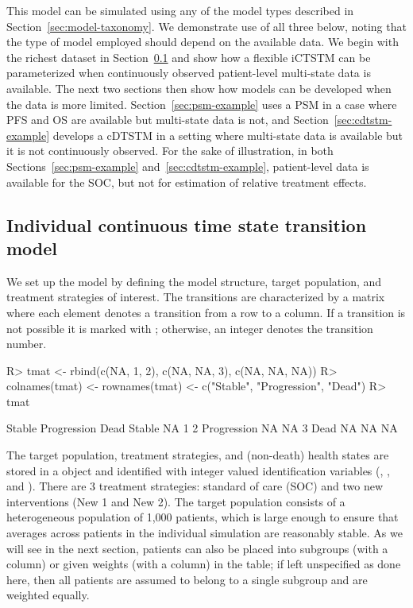 \documentclass[article, nojss]{jss}\usepackage[]{graphicx}\usepackage[]{color}
\begin{document}
This model can be simulated using any of the model types described in Section~\ref{sec:model-taxonomy}. We demonstrate use of all three below, noting that the type of model employed should depend on the available data. We begin with the richest dataset in Section~\ref{sec:ictstm-example} and show how a flexible iCTSTM can be parameterized when continuously observed patient-level multi-state data is available. The next two sections then show how models can be developed when the data is more limited. Section~\ref{sec:psm-example} uses a PSM in a case where PFS and OS are available but multi-state data is not, and Section~\ref{sec:cdtstm-example} develops a cDTSTM in a setting where multi-state data is available but it is not continuously observed. For the sake of illustration, in both Sections~\ref{sec:psm-example} and~\ref{sec:cdtstm-example}, patient-level data is available for the SOC, but not for estimation of relative treatment effects.

\subsection{Individual continuous time state transition model} \label{sec:ictstm-example}
We set up the model by defining the model structure, target population, and treatment strategies of interest. The transitions are characterized by a matrix where each element denotes a transition from a row to a column. If a transition is not possible it is marked with ; otherwise, an integer denotes the transition number.

\begin{Schunk}
\begin{Sinput}
R> tmat <- rbind(c(NA, 1, 2), c(NA, NA, 3), c(NA, NA, NA))
R> colnames(tmat) <- rownames(tmat) <- c("Stable", "Progression", "Dead")
R> tmat
\end{Sinput}
\begin{Soutput}
            Stable Progression Dead
Stable          NA           1    2
Progression     NA          NA    3
Dead            NA          NA   NA
\end{Soutput}
\end{Schunk}

The target population, treatment strategies, and (non-death) health states are stored in a  object and identified with integer valued identification variables (, , and ). There are 3 treatment strategies: standard of care (SOC) and two new interventions (New 1 and New 2). The target population consists of a heterogeneous population of 1,000 patients, which is large enough to ensure that averages across patients in the individual simulation are reasonably stable. As we will see in the next section, patients can also be placed into subgroups (with a  column) or given weights (with a  column) in the  table; if left unspecified as done here, then all patients are assumed to belong to a single subgroup and are weighted equally.
\end{document}
